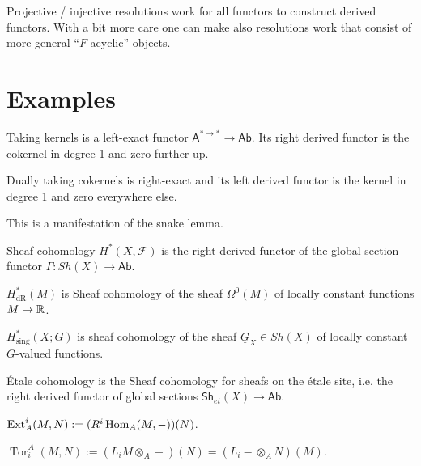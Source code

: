 \documentclass[fontsize=11pt,fleqn,a4paper]{scrartcl}
\begin{document}
\begin{remark}
Projective / injective resolutions work for all functors to construct derived functors. With a bit more care one can make also resolutions work that consist of more general \enquote{$F$-acyclic} objects.
\end{remark}

\section{Examples}

\begin{example}
Taking kernels is a left-exact functor $\mathsf{A}^{\ast\to\ast} \to \mathsf{Ab}$. Its right derived functor is the cokernel in degree 1 and zero further up.

Dually taking cokernels is right-exact and its left derived functor is the kernel in degree 1 and zero everywhere else.

This is a manifestation of the snake lemma.
\end{example}

\begin{example}
Sheaf cohomology $H^\ast(X,\mathcal{F})$ is the right derived functor of the global section functor $\Gamma: Sh(X) \to \mathsf{Ab}$.
\end{example}

\begin{example}
$H_\text{dR}^\ast(M)$ is Sheaf cohomology of the sheaf $\Omega^0(M)$ of locally constant functions $M\to\mathbb{R}$.
\end{example}

\begin{example}
$H_\text{sing}^\ast(X;G)$ is sheaf cohomology of the sheaf $\underline{G}_X\in Sh(X)$ of locally constant $G$-valued functions.
\end{example}

\begin{example}
Étale cohomology is the Sheaf cohomology for sheafs on the étale site, i.e. the right derived functor of global sections $\mathsf{Sh}_{et}(X) \to \mathsf{Ab}$.
\end{example}

\begin{example}
$\operatorname{Ext}_A^i(M,N) := (R^i \operatorname{Hom}_A(M,-))(N)$.

$\operatorname{Tor}_i^A(M,N) := (L_i M\otimes_A -)(N) = (L_i -\otimes_A N)(M)$.
\end{example}
\end{document}
